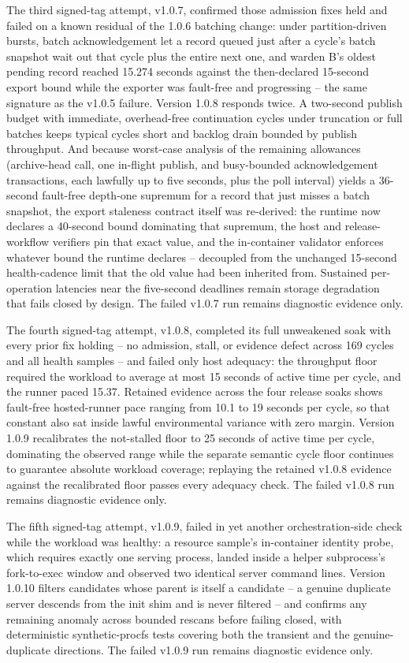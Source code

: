 \documentclass[10pt]{article}
\begin{document}
The third signed-tag attempt, v1.0.7, confirmed those admission fixes held and failed on a known
residual of the 1.0.6 batching change: under partition-driven bursts, batch acknowledgement let a
record queued just after a cycle's batch snapshot wait out that cycle plus the entire next one,
and warden B's oldest pending record reached 15.274 seconds against the then-declared 15-second
export bound while the exporter was fault-free and progressing -- the same signature as the
v1.0.5 failure. Version 1.0.8 responds twice. A two-second publish budget with immediate,
overhead-free continuation cycles under truncation or full batches keeps typical cycles short
and backlog drain bounded by publish throughput. And because worst-case analysis of the
remaining allowances (archive-head call, one in-flight publish, and busy-bounded acknowledgement
transactions, each lawfully up to five seconds, plus the poll interval) yields a 36-second
fault-free depth-one supremum for a record that just misses a batch snapshot, the export
staleness contract itself was re-derived: the runtime now declares a 40-second bound dominating
that supremum, the host and release-workflow verifiers pin that exact value, and the
in-container validator enforces whatever bound the runtime declares -- decoupled from the
unchanged 15-second health-cadence limit that the old value had been inherited from. Sustained
per-operation latencies near the five-second deadlines remain storage degradation that fails
closed by design. The failed v1.0.7 run remains diagnostic evidence only.

The fourth signed-tag attempt, v1.0.8, completed its full unweakened soak with every prior fix
holding -- no admission, stall, or evidence defect across 169 cycles and all health samples --
and failed only host adequacy: the throughput floor required the workload to average at most 15
seconds of active time per cycle, and the runner paced 15.37. Retained evidence across the four
release soaks shows fault-free hosted-runner pace ranging from 10.1 to 19 seconds per cycle, so
that constant also sat inside lawful environmental variance with zero margin. Version 1.0.9
recalibrates the not-stalled floor to 25 seconds of active time per cycle, dominating the
observed range while the separate semantic cycle floor continues to guarantee absolute workload
coverage; replaying the retained v1.0.8 evidence against the recalibrated floor passes every
adequacy check. The failed v1.0.8 run remains diagnostic evidence only.

The fifth signed-tag attempt, v1.0.9, failed in yet another orchestration-side check while the
workload was healthy: a resource sample's in-container identity probe, which requires exactly
one serving process, landed inside a helper subprocess's fork-to-exec window and observed two
identical server command lines. Version 1.0.10 filters candidates whose parent is itself a
candidate -- a genuine duplicate server descends from the init shim and is never filtered --
and confirms any remaining anomaly across bounded rescans before failing closed, with
deterministic synthetic-procfs tests covering both the transient and the genuine-duplicate
directions. The failed v1.0.9 run remains diagnostic evidence only.
\end{document}

